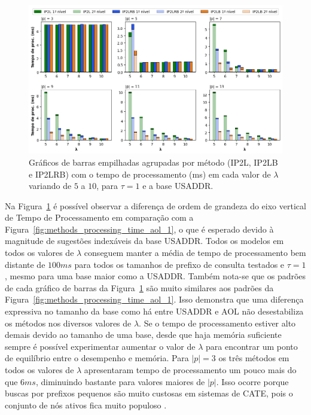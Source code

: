 \begin{figure} [h]
    \centering
    \includegraphics[width=1.0\textwidth]{figures/methods_processing_time_usaddr_1.png}
    \caption{Gráficos de barras empilhadas agrupadas por método (IP2L, IP2LB e IP2LRB) com o tempo de processamento (ms) em cada valor de $\lambda$ variando de $5$ a $10$, para $\tau=1$ e a base USADDR.}
    \label{fig:methods_processing_time_usaddr_1}
\end{figure}


Na Figura~\ref{fig:methods_processing_time_usaddr_1} é possível observar a diferença de ordem de grandeza do eixo vertical de Tempo de Processamento em comparação com a Figura~\ref{fig:methods_processing_time_aol_1}, o que é esperado devido à magnitude de sugestões indexáveis da base USADDR. Todos os modelos em todos os valores de $\lambda$ conseguem manter a média de tempo de processamento bem distante de $100ms$ para todos os tamanhos de prefixo de consulta testados e $\tau=1$, mesmo para uma base maior como a USADDR. Também nota-se que os padrões de cada gráfico de barras da Figura~\ref{fig:methods_processing_time_usaddr_1} são muito similares aos padrões da Figura~\ref{fig:methods_processing_time_aol_1}. Isso demonstra que uma diferença expressiva no tamanho da base como há entre USADDR e AOL não desestabiliza os métodos nos diversos valores de $\lambda$. Se o tempo de processamento estiver alto demais devido ao tamanho de uma base, desde que haja memória suficiente sempre é possível experimentar aumentar o valor de $\lambda$ para encontrar um ponto de equilíbrio entre o desempenho e memória. Para $|p|=3$ os três métodos em todos os valores de $\lambda$ apresentaram tempo de processamento um pouco mais do que $6ms$, diminuindo bastante para valores maiores de $|p|$. Isso ocorre porque buscas por prefixos pequenos são muito custosas em sistemas de CATE, pois o conjunto de nós ativos fica muito populoso \citep{xiao2013efficient, berg2020}.

